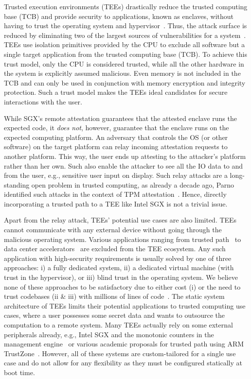 Trusted execution environments (TEEs) drastically reduce the trusted computing base (TCB) and provide security to applications, known as enclaves, without having to trust the operating system and hypervisor~\cite{costan2016intel,winter2008trusted,costan2016sanctum}. Thus, the attack surface is reduced by eliminating two of the largest sources of vulnerabilities for a system~\cite{checkoway2013iago,suzaki2011memory}. TEEs use isolation primitives provided by the CPU to exclude all software but a single target application from the trusted computing base (TCB). To achieve this trust model, only the CPU is considered trusted, while all the other hardware in the system is explicitly assumed malicious. Even memory is not included in the TCB and can only be used in conjunction with memory encryption and integrity protection. Such a trust model makes the TEEs ideal candidates for secure interactions with the user. 


While SGX's remote attestation guarantees that the attested enclave runs the expected code, it \emph{does not}, however,  guarantee that the enclave runs on the expected computing platform. An adversary that controls the OS (or other software) on the target platform can relay incoming attestation requests to another platform. This way, the user ends up attesting to the attacker's platform rather than her own. Such also enable the attacker to see all the IO data to and from the user, e.g., sensitive user input on display. Such relay attacks are a long-standing open problem in trusted computing, as already a decade ago, Parno identified such attacks in the context of TPM attestation~\cite{parno2008bootstrapping}. Hence, directly incorporating a trusted path to a TEE like Intel SGX is not a trivial issue.



Apart from the relay attack, TEEs' potential use cases are also limited.  TEEs cannot communicate with any external device without going through the malicious operating system. Various applications ranging from trusted path~\cite{zhou2012building,Fidelius,protection} to data center accelerators~\cite{volos2018graviton} are excluded from the TEE ecosystem. Any such application with high-security requirements is usually solved by one of three approaches: i) a fully dedicated system, ii) a dedicated virtual machine (with trust in the hypervisor), or iii) blind trust in the operating system. We believe none of these approaches to be satisfactory due to either cost (i) or the need to trust codebases (ii \& iii) with millions of lines of code~\cite{torvalds2020linux,barham2003xen}.
The static system architecture of TEEs limits their potential applications to trusted computing use cases, where a user possesses some secret data and wants to outsource the computation to a remote system. Many TEEs actually rely on some external peripherals already, e.g., Intel SGX and the monotonic counters in the management engine~\cite{matetic2017rote} or various academic proposals for trusted path using ARM TrustZone~\cite{SeCloak,VButton}. However, all of these systems are custom-tailored for a single use case and do not allow for any flexibility as they must be configured statically at boot time.


